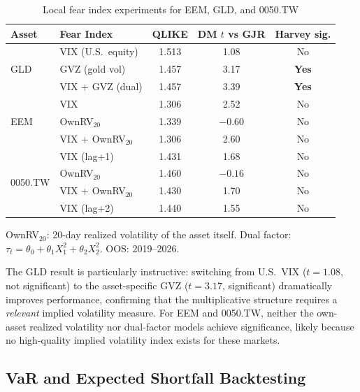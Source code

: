 \documentclass[12pt,a4paper]{article}
\begin{document}
\begin{table}[H]
\centering
\caption{Local fear index experiments for EEM, GLD, and 0050.TW}
\label{tab:local_fear}
\begin{threeparttable}
\small
\begin{tabular}{@{}llccc@{}}
\toprule
Asset & Fear Index & QLIKE & DM $t$ vs GJR & Harvey sig. \\
\midrule
\multirow{3}{*}{GLD} & VIX (U.S.\ equity) & 1.513 & 1.08 & No \\
                      & GVZ (gold vol) & 1.457 & 3.17 & \textbf{Yes} \\
                      & VIX + GVZ (dual) & 1.457 & 3.39 & \textbf{Yes} \\
\midrule
\multirow{3}{*}{EEM} & VIX & 1.306 & 2.52 & No \\
                      & OwnRV$_{20}$ & 1.339 & $-0.60$ & No \\
                      & VIX + OwnRV$_{20}$ & 1.306 & 2.60 & No \\
\midrule
\multirow{4}{*}{0050.TW} & VIX (lag+1) & 1.431 & 1.68 & No \\
                          & OwnRV$_{20}$ & 1.460 & $-0.16$ & No \\
                          & VIX + OwnRV$_{20}$ & 1.430 & 1.70 & No \\
                          & VIX (lag+2) & 1.440 & 1.55 & No \\
\bottomrule
\end{tabular}
\begin{tablenotes}
\footnotesize
\item OwnRV$_{20}$: 20-day realized volatility of the asset itself. Dual factor: $\tau_t = \theta_0 + \theta_1 X_1^2 + \theta_2 X_2^2$. OOS: 2019--2026.
\end{tablenotes}
\end{threeparttable}
\end{table}

The GLD result is particularly instructive: switching from U.S.\ VIX ($t = 1.08$, not significant) to the asset-specific GVZ ($t = 3.17$, significant) dramatically improves performance, confirming that the multiplicative structure requires a \emph{relevant} implied volatility measure. For EEM and 0050.TW, neither the own-asset realized volatility nor dual-factor models achieve significance, likely because no high-quality implied volatility index exists for these markets.

\subsection{VaR and Expected Shortfall Backtesting}
\label{sec:var_es}
\end{document}
